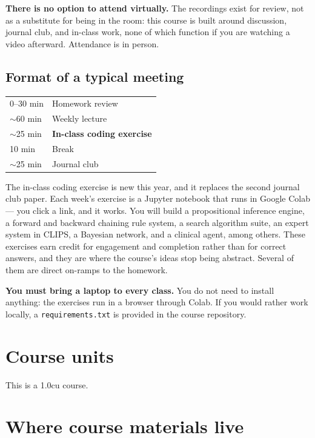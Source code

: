 \documentclass[11pt]{article}
\begin{document}
\textbf{There is no option to attend virtually.} The recordings exist for review, not as a
substitute for being in the room: this course is built around discussion, journal club, and
in-class work, none of which function if you are watching a video afterward. Attendance is in
person.

\subsection{Format of a typical meeting}

\begin{tabular}{@{}ll@{}}
  \toprule
  0--30 min & Homework review \\
  $\sim$60 min & Weekly lecture \\
  $\sim$25 min & \textbf{In-class coding exercise} \\
  10 min & Break \\
  $\sim$25 min & Journal club \\
  \bottomrule
\end{tabular}

The in-class coding exercise is new this year, and it replaces the second journal club paper.
Each week's exercise is a Jupyter notebook that runs in Google Colab --- you click a link, and it
works. You will build a propositional inference engine, a forward and backward chaining rule
system, a search algorithm suite, an expert system in CLIPS, a Bayesian network, and a clinical
agent, among others. These exercises earn credit for engagement and completion rather than for
correct answers, and they are where the course's ideas stop being abstract. Several of them are
direct on-ramps to the homework.

\textbf{You must bring a laptop to every class.} You do not need to install anything: the
exercises run in a browser through Colab. If you would rather work locally, a
\texttt{requirements.txt} is provided in the course repository.

\section{Course units}

This is a 1.0cu course.

\section{Where course materials live}
\end{document}
